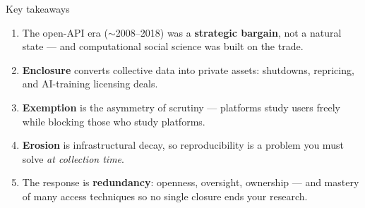 \documentclass[9pt,aspectratio=169]{beamer}
\begin{document}
\begin{frame}{Key takeaways}
    \begin{enumerate}
        \item The open-API era ($\sim$2008--2018) was a \textbf{strategic bargain}, not a natural state --- and computational social science was built on the trade.
        \item \textbf{Enclosure} converts collective data into private assets: shutdowns, repricing, and AI-training licensing deals.
        \item \textbf{Exemption} is the asymmetry of scrutiny --- platforms study users freely while blocking those who study platforms.
        \item \textbf{Erosion} is infrastructural decay, so reproducibility is a problem you must solve \textit{at collection time}.
        \item The response is \textbf{redundancy}: openness, oversight, ownership --- and mastery of many access techniques so no single closure ends your research.
    \end{enumerate}
    \vspace{0.5em}
\end{frame}
\end{document}
